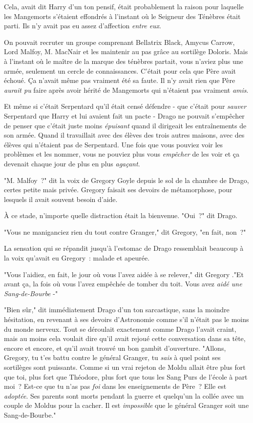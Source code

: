 Cela, avait dit Harry d'un ton pensif, était probablement la raison pour laquelle les Mangemorts s'étaient effondrés à l'instant où le Seigneur des Ténèbres était parti. Ils n'y avait pas eu assez d'affection \emph{entre eux}.

On pouvait recruter un groupe comprenant Bellatrix Black, Amycus Carrow, Lord Malfoy, M. MacNair et les maintenir au pas grâce au sortilège Doloris. Mais à l'instant où le maître de la marque des ténèbres partait, vous n'aviez plus une armée, seulement un cercle de connaissances. C'était pour cela que Père avait échoué. Ça n'avait même pas vraiment été sa faute. Il n'y avait rien que Père \emph{aurait pu} faire après avoir hérité de Mangemorts qui n'étaient pas vraiment \emph{amis}.

Et même si c'était Serpentard qu'il était censé défendre - que c'était pour \emph{sauver} Serpentard que Harry et lui avaient fait un pacte - Drago ne pouvait s'empêcher de penser que c'était juste moins \emph{épuisant} quand il dirigeait les entraînements de son armée. Quand il travaillait avec des élèves des trois autres maisons, avec des élèves qui n'étaient pas de Serpentard. Une fois que vous pouviez voir les problèmes et les nommer, vous ne pouviez plus vous \emph{empêcher} de les voir et ça devenait chaque jour de plus en plus \emph{agaçant}.

"M. Malfoy~?" dit la voix de Gregory Goyle depuis le sol de la chambre de Drago, certes petite mais privée. Gregory faisait ses devoirs de métamorphose, pour lesquels il avait souvent besoin d'aide.

À ce stade, n'importe quelle distraction était la bienvenue. "Oui~?" dit Drago.

"Vous ne maniganciez rien du tout contre Granger," dit Gregory, "en fait, non~?"

La sensation qui se répandit jusqu'à l'estomac de Drago ressemblait beaucoup à la voix qu'avait eu Gregory~: malade et apeurée.

"Vous l'aidiez, en fait, le jour où vous l'avez aidée à se relever," dit Gregory ."Et avant ça, la fois où vous l'avez empêchée de tomber du toit. Vous avez \emph{aidé une Sang-de-Bourbe} -"

"Bien sûr," dit immédiatement Drago d'un ton sarcastique, sans la moindre hésitation, en revenant à ses devoirs d'Astronomie comme s'il n'était pas le moins du monde nerveux. Tout se déroulait exactement comme Drago l'avait craint, mais au moins cela voulait dire qu'il avait rejoué cette conversation dans sa tête, encore et encore, et qu'il avait trouvé un bon gambit d'ouverture. "Allons, Gregory, tu t'es battu contre le général Granger, tu \emph{sais} à quel point ses sortilèges sont puissants. Comme si un vrai rejeton de Moldu allait être plus fort que toi, plus fort que Théodore, plus fort que tous les Sang Purs de l'école à part moi~? Est-ce que tu n'as pas \emph{foi} dans les enseignements de Père~? Elle est \emph{adoptée}. Ses parents sont morts pendant la guerre et quelqu'un la collée avec un couple de Moldus pour la cacher. Il est \emph{impossible} que le général Granger soit une Sang-de-Bourbe."

